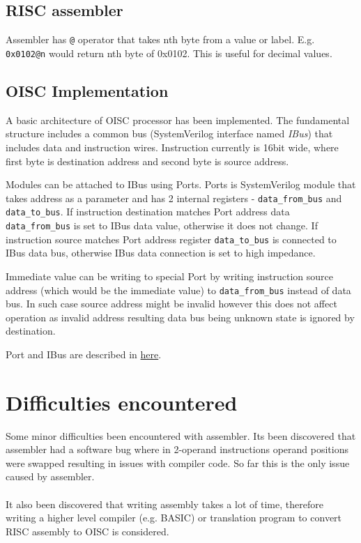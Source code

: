 \documentclass[a4paper,11pt]{article}
\begin{document}
\subsection{RISC assembler}
Assembler has \texttt{@} operator that takes nth byte from a value or label. E.g. \texttt{0x0102@n} would return nth byte of 0x0102. This is useful for decimal values.
\subsection{OISC Implementation}
A basic architecture of OISC processor has been implemented. The fundamental structure includes a common bus (SystemVerilog interface named \textit{IBus}) that includes data and instruction wires. Instruction currently is 16bit wide, where first byte is destination address and second byte is source address.

Modules can be attached to IBus using Ports. Ports is SystemVerilog module that takes address as a parameter and has 2 internal registers - \texttt{data\_from\_bus} and \texttt{data\_to\_bus}. If instruction destination matches Port address data \texttt{data\_from\_bus} is set to IBus data value, otherwise it does not change. If instruction source matches Port address register \texttt{data\_to\_bus} is connected to IBus data bus, otherwise IBus data connection is set to high impedance. 

Immediate value can be writing to special Port by writing instruction source address (which would be the immediate value) to \texttt{data\_from\_bus} instead of data bus. In such case source address might be invalid however this does not affect operation as invalid address resulting data bus being unknown state is ignored by destination.

Port and IBus are described in \href{https://gogs.infcof.com/min/ucl_project_y3/src/a075e40b996c00e83dd3ac838108fa16b4a89cb0/src/oisc/oisc.sv}{here}.

\section{Difficulties encountered}
Some minor difficulties been encountered with assembler. Its been discovered that assembler had a software bug where in 2-operand instructions operand positions were swapped resulting in issues with compiler code. So far this is the only issue caused by assembler.
\\ \\
It also been discovered that writing assembly takes a lot of time, therefore writing a higher level compiler (e.g. BASIC) or translation program to convert RISC assembly to OISC is considered.
\end{document}
